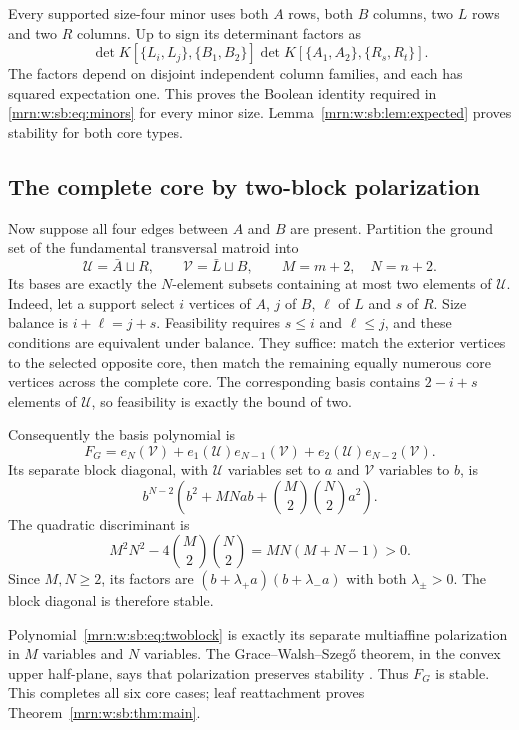 \documentclass[11pt,a4paper]{article}
\theoremstyle{remark}\newtheorem{remark}[theorem]{Remark}
\begin{document}
Every supported size-four minor uses both $A$ rows, both $B$ columns, two $L$ rows and two $R$ columns. Up to sign its determinant factors as
\[
 \det K[\{L_i,L_j\},\{B_1,B_2\}]
 \det K[\{A_1,A_2\},\{R_s,R_t\}].
\]
The factors depend on disjoint independent column families, and each has squared expectation one. This proves the Boolean identity required in \eqref{mrn:w:sb:eq:minors} for every minor size. Lemma~\ref{mrn:w:sb:lem:expected} proves stability for both core types.

\subsection{The complete core by two-block polarization}
Now suppose all four edges between $A$ and $B$ are present. Partition the ground set of the fundamental transversal matroid into
\[
 \mathcal U=\bar A\sqcup R,\qquad
 \mathcal V=\bar L\sqcup B,
 \qquad M=m+2,\quad N=n+2.
\]
Its bases are exactly the $N$-element subsets containing at most two elements of $\mathcal U$. Indeed, let a support select $i$ vertices of $A$, $j$ of $B$, $\ell$ of $L$ and $s$ of $R$. Size balance is $i+\ell=j+s$. Feasibility requires $s\le i$ and $\ell\le j$, and these conditions are equivalent under balance. They suffice: match the exterior vertices to the selected opposite core, then match the remaining equally numerous core vertices across the complete core. The corresponding basis contains $2-i+s$ elements of $\mathcal U$, so feasibility is exactly the bound of two.

Consequently the basis polynomial is
\begin{equation}\label{mrn:w:sb:eq:twoblock}
 F_G=e_N(\mathcal V)+e_1(\mathcal U)e_{N-1}(\mathcal V)
                          +e_2(\mathcal U)e_{N-2}(\mathcal V).
\end{equation}
Its separate block diagonal, with $\mathcal U$ variables set to $a$ and $\mathcal V$ variables to $b$, is
\[
 b^{N-2}\left(b^2+MNab+\binom M2\binom N2a^2\right).
\]
The quadratic discriminant is
\begin{equation}\label{mrn:w:sb:eq:discriminant}
 M^2N^2-4\binom M2\binom N2=MN(M+N-1)>0.
\end{equation}
Since $M,N\ge2$, its factors are $(b+\lambda_+a)(b+\lambda_-a)$ with both $\lambda_\pm>0$. The block diagonal is therefore stable.

Polynomial~\eqref{mrn:w:sb:eq:twoblock} is exactly its separate multiaffine polarization in $M$ variables and $N$ variables. The Grace--Walsh--Szeg\H{o} theorem, in the convex upper half-plane, says that polarization preserves stability \cite{b:BB}. Thus $F_G$ is stable. This completes all six core cases; leaf reattachment proves Theorem~\ref{mrn:w:sb:thm:main}.
\end{document}
